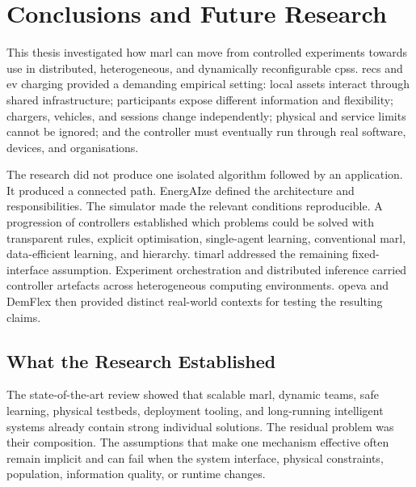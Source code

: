 \chapter{Conclusions and Future Research}
\label{chap:conclusions}

This thesis investigated how \gls{marl} can move from controlled experiments towards use in distributed, heterogeneous, and dynamically reconfigurable \glspl{cps}. \glspl{rec} and \gls{ev} charging provided a demanding empirical setting: local assets interact through shared infrastructure; participants expose different information and flexibility; chargers, vehicles, and sessions change independently; physical and service limits cannot be ignored; and the controller must eventually run through real software, devices, and organisations.

The research did not produce one isolated algorithm followed by an application. It produced a connected path. EnergAIze defined the architecture and responsibilities. The simulator made the relevant conditions reproducible. A progression of controllers established which problems could be solved with transparent rules, explicit optimisation, single-agent learning, conventional \gls{marl}, data-efficient learning, and hierarchy. \gls{timarl} addressed the remaining fixed-interface assumption. Experiment orchestration and distributed inference carried controller artefacts across heterogeneous computing environments. \gls{opeva} and DemFlex then provided distinct real-world contexts for testing the resulting claims.


\section{What the Research Established}
\label{sec:conclusion-recap}
\label{sec:conclusion-findings}

The state-of-the-art review showed that scalable \gls{marl}, dynamic teams, safe learning, physical testbeds, deployment tooling, and long-running intelligent systems already contain strong individual solutions. The residual problem was their composition. The assumptions that make one mechanism effective often remain implicit and can fail when the system interface, physical constraints, population, information quality, or runtime changes.

